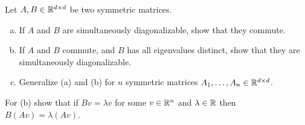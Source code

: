\begin{myexercise}\label{prob:commuting_vs_sim_diag}
    Let $A, B \in \mathbb{R}^{d\times d}$ be two symmetric matrices.
    \begin{enumerate}[(a)]
        \item If $A$ and $B$ are simultaneously diagonalizable, show that they commute.
        
        \item If $A$ and $B$ commute, and $B$ has all eigenvalues distinct, show that they are simultaneously diagonalizable.

        \item Generalize (a) and (b) for $n$ symmetric matrices $A_1,\ldots, A_n \in \mathbb{R}^{d\times d}$.
    \end{enumerate}
\end{myexercise}
\begin{hint}
    For (b) show that if $B v = \lambda v$ for some $v \in \mathbb{R}^n$ and $\lambda \in \mathbb{R}$ then $B (A v) = \lambda (A v)$.
\end{hint}

